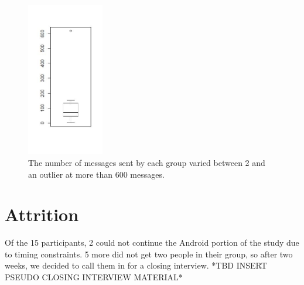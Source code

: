     \begin{figure}
    \centering
    \includegraphics[width=0.3\textwidth]{messages_per_group.jpeg}
    \caption[Messages Sent by Groups]{
      The number of messages sent by each group varied between
      2 and an outlier at more than 600 messages.
    }
    \label{fig:topic_hours}
    \end{figure}

      

  \section{Attrition}
  \label{sec:Android}
  Of the 15 participants, 2 could not continue the Android portion
  of the study due to timing constraints.
  5 more did not get two people in their group,
  so after two weeks,
  we decided to call them in for a closing interview.
  *TBD INSERT PSEUDO CLOSING INTERVIEW MATERIAL*

